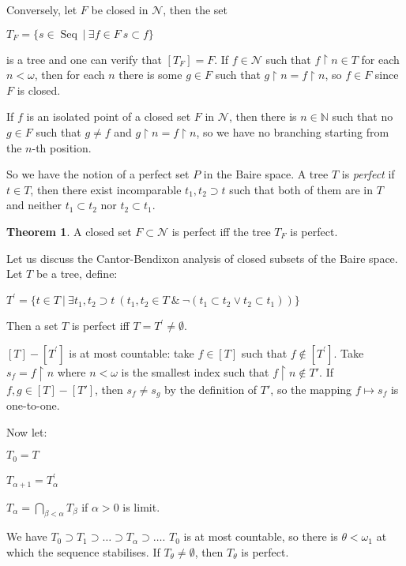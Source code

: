\documentclass[8pt]{article}
\theoremstyle{definition}
\theoremstyle{definition}
\newtheorem{theorem}{Theorem}[section]
\theoremstyle{definition}
\theoremstyle{definition}
\theoremstyle{definition}
\theoremstyle{definition}
\theoremstyle{definition}
\theoremstyle{definition}
\theoremstyle{definition}
\theoremstyle{definition}
\theoremstyle{definition}
\theoremstyle{definition}
\theoremstyle{definition}
\theoremstyle{definition}
\theoremstyle{question}
\begin{document}
Conversely, let $F$ be closed in $\mathcal{N}$, then the set
\begin{center}
  $T_F = \{ s \in \operatorname{Seq} \: | \: \exists f \in F \: s \subset f \}$
\end{center}
is a tree and one can verify that $[T_F] = F$. If $f \in \mathcal{N}$ such that $f \upharpoonright n \in T$
for each $n < \omega$, then for each $n$ there is some $g \in F$ such that 
$g \upharpoonright n = f \upharpoonright n$, so $f \in F$ since $F$ is closed.

If $f$ is an isolated point of a closed set $F$ in $\mathcal{N}$, then there is $n \in \mathbb{N}$ such that no
$g \in F$ such that $g \neq f$ and $g \upharpoonright n = f \upharpoonright n$, so we have no branching starting from the
$n$-th position.

So we have the notion of a perfect set $P$ in the Baire space. A tree $T$ is \emph{perfect} if $t \in T$, then there
exist incomparable $t_1, t_2 \supset t$ such that both of them are in $T$ and neither $t_1 \subset t_2$ nor $t_2 \subset t_1$.

\begin{theorem}
  A closed set $F \subset \mathcal{N}$ is perfect iff the tree $T_F$ is perfect.
\end{theorem}

Let us discuss the Cantor-Bendixon analysis of closed subsets of the Baire space. Let $T$ be a tree, define:
\begin{center}
  $T^{'} = \{ t \in T \: | \: \exists t_1, t_2 \supset t \: (t_1, t_2 \in T \: \& \: \neg (t_1 \subset t_2 \lor t_2 \subset t_1))\}$
\end{center}

Then a set $T$ is perfect iff $T = T^{'} \neq \emptyset$.

$[T] - [T^{'}]$ is at most countable: take $f \in [T]$ such that $f \notin [T^{'}]$.
Take $s_f = f \upharpoonright n$ where $n < \omega$ is the smallest index such that $f \upharpoonright n \notin T'$.
If $f, g \in [T] - [T']$, then $s_f \neq s_g$ by the definition of $T'$, so the mapping $f \mapsto s_f$ is one-to-one.

Now let:
\begin{center}
  $T_0 = T$
  
  $T_{\alpha + 1} = T^{'}_{\alpha}$

  $T_{\alpha} = \bigcap \limits_{\beta < \alpha} T_{\beta}$ if $\alpha > 0$ is limit.
\end{center}

We have $T_0 \supset T_1 \supset \dots \supset T_{\alpha} \supset \dots$. $T_0$ is at most countable, so there is
$\theta < \omega_1$ at which the sequence stabilises. If $T_{\theta} \neq \emptyset$, then $T_{\theta}$ is perfect.
\end{document}
